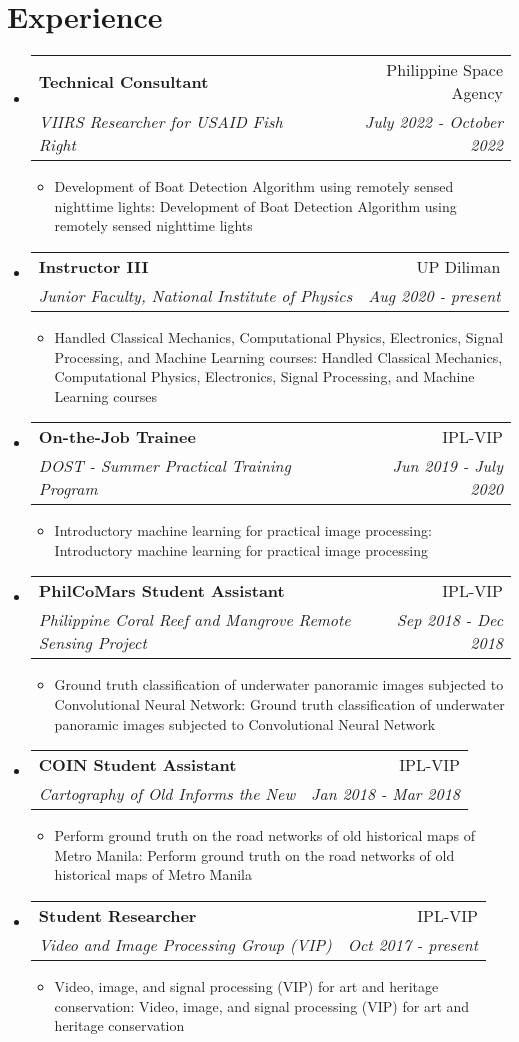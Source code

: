 \documentclass[a4paper,10pt]{article}
\makeatletter
\def \ifempty#1{\def\temp{#1} \ifx\temp\empty }
\newcommand{\resumeItem}[2]{
  \item\small{
  	\ifempty{#1}#2\else\textbf{#1}{: #2 \vspace{-2pt}}\fi
  }
}
\newcommand{\resumeSubheading}[4]{
  \vspace{-1pt}\item
    \begin{tabular*}{0.97\textwidth}{l@{\extracolsep{\fill}}r}
      \textbf{#1} & #2 \\
      \textit{\small#3} & \textit{\small #4} \\
    \end{tabular*}\vspace{-5pt}
}
\newcommand{\resumeSubHeadingListStart}{\begin{itemize}[leftmargin=*]}
\newcommand{\resumeSubHeadingListEnd}{\end{itemize}}
\newcommand{\resumeItemListStart}{\begin{itemize}}
\newcommand{\resumeItemListEnd}{\end{itemize}\vspace{-5pt}}
\makeatother
\begin{document}
\section{Experience}
  \resumeSubHeadingListStart
    \resumeSubheading
      {Technical Consultant}{Philippine Space Agency}{VIIRS Researcher for USAID Fish Right}{July 2022 - October 2022}
    \resumeItemListStart
      \resumeItem{}
          {Development of Boat Detection Algorithm using remotely sensed nighttime lights}
      \resumeItemListEnd
    \resumeSubheading
      {Instructor III}{UP Diliman}{Junior Faculty, National Institute of Physics}{Aug 2020 - present}
    \resumeItemListStart
      	\resumeItem{}
          {Handled Classical Mechanics, Computational Physics, Electronics, Signal Processing, and Machine Learning courses}
      \resumeItemListEnd
    \resumeSubheading    
      {On-the-Job Trainee}{IPL-VIP}
      {DOST - Summer Practical Training Program}{Jun 2019 - July 2020}
      \resumeItemListStart
      	\resumeItem{}
          {Introductory machine learning for practical image processing}
      \resumeItemListEnd
        \resumeSubheading
      {PhilCoMars Student Assistant}{IPL-VIP}
      {Philippine Coral Reef and Mangrove Remote Sensing Project}{Sep 2018 - Dec 2018}
      \resumeItemListStart
      	\resumeItem{}
          {Ground truth classification of underwater panoramic images subjected to Convolutional Neural Network}
      \resumeItemListEnd
      \resumeSubheading
      {COIN Student Assistant}{IPL-VIP}
      {Cartography of Old Informs the New}{Jan 2018 - Mar 2018}
      \resumeItemListStart
      	\resumeItem{}
          {Perform ground truth on the road networks of old historical maps of Metro Manila}
      \resumeItemListEnd
        \resumeSubheading
      {Student Researcher}{IPL-VIP}
      {Video and Image Processing Group (VIP)}{Oct 2017 - present}
      \resumeItemListStart
      	\resumeItem{}
          {Video, image, and signal processing (VIP) for art and heritage conservation}
      \resumeItemListEnd
  \resumeSubHeadingListEnd


\end{document}

